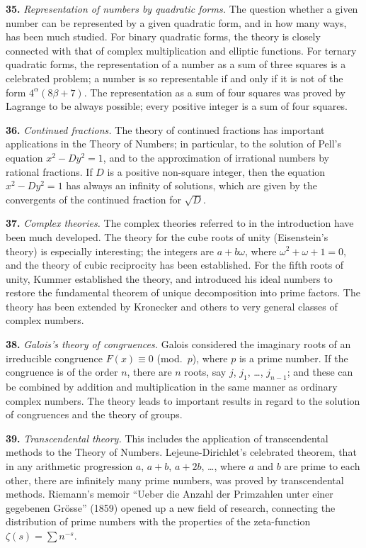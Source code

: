 \documentclass[11pt,a4paper]{article}
\begin{document}
\textbf{35.}\quad
\textit{Representation of numbers by quadratic forms.} The question whether a given number can be represented by a given quadratic form, and in how many ways, has been much studied. For binary quadratic forms, the theory is closely connected with that of complex multiplication and elliptic functions. For ternary quadratic forms, the representation of a number as a sum of three squares is a celebrated problem; a number is so representable if and only if it is not of the form $4^{\alpha}(8\beta + 7)$. The representation as a sum of four squares was proved by Lagrange to be always possible; every positive integer is a sum of four squares.

\textbf{36.}\quad
\textit{Continued fractions.} The theory of continued fractions has important applications in the Theory of Numbers; in particular, to the solution of Pell's equation $x^{2} - Dy^{2} = 1$, and to the approximation of irrational numbers by rational fractions. If $D$ is a positive non-square integer, then the equation $x^{2} - Dy^{2} = 1$ has always an infinity of solutions, which are given by the convergents of the continued fraction for $\sqrt{D}$.

\textbf{37.}\quad
\textit{Complex theories.} The complex theories referred to in the introduction have been much developed. The theory for the cube roots of unity (Eisenstein's theory) is especially interesting; the integers are $a + b\omega$, where $\omega^{2} + \omega + 1 = 0$, and the theory of cubic reciprocity has been established. For the fifth roots of unity, Kummer established the theory, and introduced his ideal numbers to restore the fundamental theorem of unique decomposition into prime factors. The theory has been extended by Kronecker and others to very general classes of complex numbers.

\textbf{38.}\quad
\textit{Galois's theory of congruences.} Galois considered the imaginary roots of an irreducible congruence $F(x) \equiv 0$ (mod.\ $p$), where $p$ is a prime number. If the congruence is of the order $n$, there are $n$ roots, say $j$, $j_{1}$, \ldots, $j_{n-1}$; and these can be combined by addition and multiplication in the same manner as ordinary complex numbers. The theory leads to important results in regard to the solution of congruences and the theory of groups.

\textbf{39.}\quad
\textit{Transcendental theory.} This includes the application of transcendental methods to the Theory of Numbers. Lejeune-Dirichlet's celebrated theorem, that in any arithmetic progression $a$, $a + b$, $a + 2b$, \ldots, where $a$ and $b$ are prime to each other, there are infinitely many prime numbers, was proved by transcendental methods. Riemann's memoir ``Ueber die Anzahl der Primzahlen unter einer gegebenen Gr\"osse'' (1859) opened up a new field of research, connecting the distribution of prime numbers with the properties of the zeta-function $\zeta(s) = \sum n^{-s}$.
\end{document}
